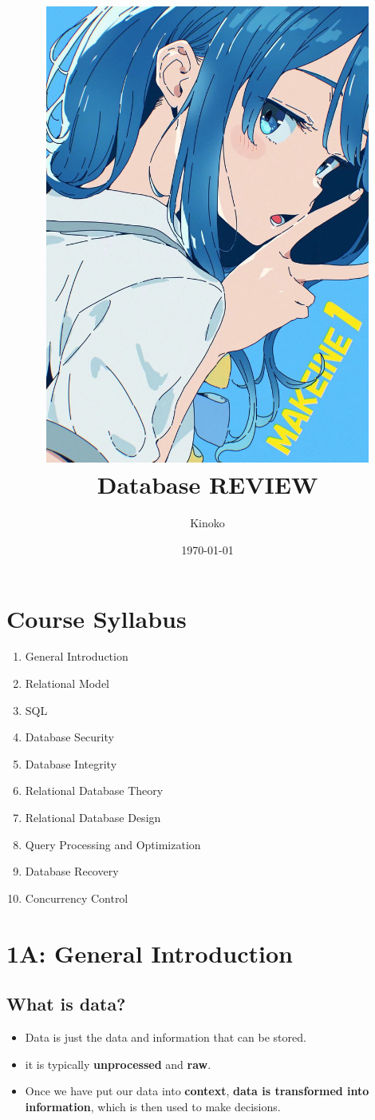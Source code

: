 \documentclass[a4paper, 12pt]{article}
\title{
    \includegraphics[width=0.8\textwidth]{Yanami_ep1.JPG}\\  %
    Database REVIEW
}
\author{Kinoko}
\date{\today}
\begin{document}

\begin{titlepage}  
    \maketitle
\end{titlepage}

\fancyhead[R]{}  %

\tableofcontents
\newpage  %


\section*{Course Syllabus}  %
    \begin{center}
        \begin{enumerate}
        \renewcommand{\labelenumi}{\Roman{enumi}.}  %
        \item General Introduction
        \item Relational Model
        \item SQL
        \item Database Security
        \item Database Integrity
        \item Relational Database Theory 
        \item Relational Database Design
        \item Query Processing and Optimization
        \item Database Recovery
        \item Concurrency Control
    \end{enumerate}
    \end{center}
    

\newpage

\setcounter{section}{0}

\section{1A: General Introduction}
    \subsection{What is data?}
        \begin{itemize}
            \item Data is just the data and information that can be stored.
            \item it is typically \textbf{unprocessed} and \textbf{raw}.
            \item Once we have put our data into \textbf{context}, \textbf{data is transformed into information}, which
            is then used to make decisions.
        \end{itemize}
    
\end{document}
